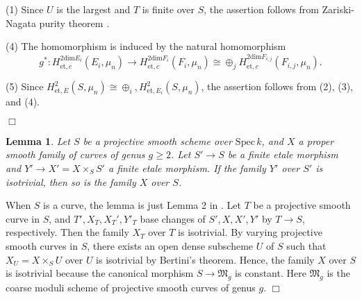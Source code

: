 \documentclass[11pt]{amsart}
\newtheorem{lemma}[Lemma]{Lemma}
\begin{document}
{ {(1) Since $U$ is the largest and $T$ is finite over $S$, 
the assertion follows from Zariski-Nagata purity theorem \cite[X, Th\'eor\`eme 3.4]{SGA2}. 

(4) The homomorphism is induced by the natural homomorphism 
$$
        g^\ast : H_{\mathrm{et}, c}^{2\mathrm{dim} E_i}(E_i, \mu_n) \rightarrow 
        H_{\mathrm{et}, c}^{2\mathrm{dim} F_i}(F_i, \mu_n) \cong \oplus_j H_{\mathrm{et}, c}^{2\mathrm{dim} F_{i, j}}(F_{i, j}, \mu_n). 
$$

(5) Since $H_{\mathrm{et}, E}^2(S, \mu_n) \cong \oplus_i, H_{\mathrm{et}, E_i}^2(S, \mu_n)$, 
the assertion follows from (2), (3), and (4). 
} \hspace*{\fill} $\Box$}

\begin{lemma}\label{etind} Let $S$ be a projective smooth scheme over $\mathrm{Spec}\, k$, 
and $X$ a proper smooth family of curves of genus $g \geq 2$. 
Let $S' \rightarrow S$ be a finite etale morphism and $Y' \rightarrow X' = X \times_SS'$ 
a finite etale morphism. If the family $Y'$ over $S'$ is isotrivial, then so is the family $X$ over $S$. 
\end{lemma} 

{ {When $S$ is a curve, the lemma is just Lemma 2 in \cite[p.235]{saidi}. 
Let $T$ be a projective smooth curve in $S$, and $T', X_T, X_T', Y'_T$ base changes of $S', X, X', Y'$ 
by $T \rightarrow S$, respectively. Then the family $X_T$ over $T$ is isotrivial. 
By varying projective smooth curves in $S$,  there exists an open dense subscheme $U$ of $S$ such that 
$X_U = X \times_SU$ over $U$ is isotrivial by Bertini's theorem. Hence, the family $X$ over $S$ is isotrivial 
because the canonical morphism $S \rightarrow \mathfrak M_g$ is constant. 
Here $\mathfrak M_g$ is the coarse moduli scheme of projective smooth curves of genus $g$. 
} \hspace*{\fill} $\Box$}

\vspace*{3mm}
\end{document}
